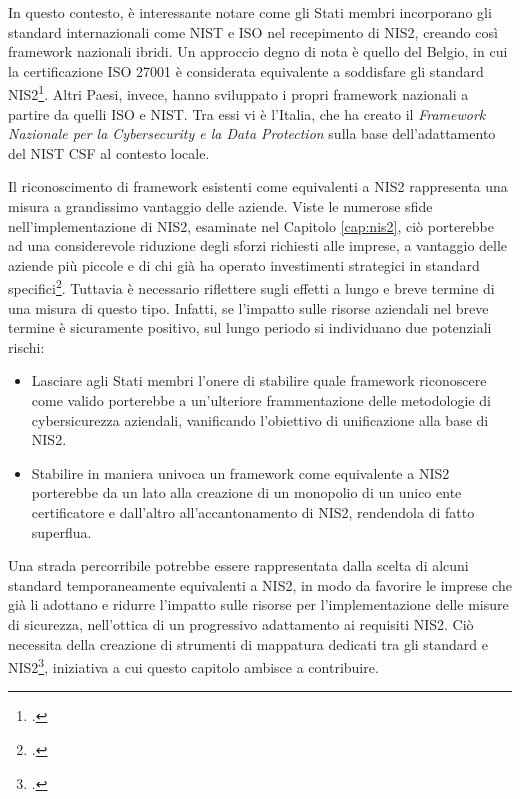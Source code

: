 In questo contesto, è interessante notare come gli Stati membri incorporano gli standard internazionali
come NIST e ISO nel recepimento di NIS2, creando così framework nazionali ibridi.
Un approccio degno di nota è quello del Belgio, in cui la certificazione ISO 27001 è considerata
equivalente a soddisfare gli standard NIS2\footcite[p. 4]{ecso-whitepaper-nis2}. Altri Paesi, invece,
hanno sviluppato i propri framework nazionali a partire da quelli ISO e NIST. Tra essi vi è l'Italia,
che ha creato il \textit{Framework Nazionale per la Cybersecurity e la Data Protection} sulla 
base dell'adattamento del NIST CSF al contesto locale.

Il riconoscimento di framework esistenti come equivalenti a NIS2 rappresenta una
misura a grandissimo vantaggio delle aziende. Viste le numerose sfide nell'implementazione
di NIS2, esaminate nel Capitolo \ref{cap:nis2}, ciò porterebbe ad una considerevole riduzione
degli sforzi richiesti alle imprese, a vantaggio delle aziende più piccole e di chi 
già ha operato investimenti strategici in standard specifici\footcite[p. 8]{ecso-whitepaper-nis2}. 
Tuttavia è necessario riflettere sugli effetti a lungo e breve termine di una misura
di questo tipo. Infatti, se l'impatto sulle risorse aziendali nel breve termine è sicuramente
positivo, sul lungo periodo si individuano due potenziali rischi:
\begin{itemize}
    \item Lasciare agli Stati membri l'onere di stabilire quale framework riconoscere come
    valido porterebbe a un'ulteriore frammentazione delle metodologie di cybersicurezza aziendali,
    vanificando l'obiettivo di unificazione alla base di NIS2.
    \item Stabilire in maniera univoca un framework come equivalente a NIS2 porterebbe da un lato
    alla creazione di un monopolio di un unico ente certificatore e dall'altro all'accantonamento
    di NIS2, rendendola di fatto superflua.
\end{itemize}
Una strada percorribile potrebbe essere rappresentata dalla scelta di alcuni standard temporaneamente
equivalenti a NIS2, in modo da favorire le imprese che già li adottano e ridurre l'impatto
sulle risorse per l'implementazione delle misure di sicurezza, nell'ottica di un progressivo
adattamento ai requisiti NIS2. Ciò necessita della creazione di strumenti di mappatura dedicati
tra gli standard e NIS2\footcite[pp. 7--9]{ecso-whitepaper-nis2}, iniziativa a cui questo capitolo
ambisce a contribuire.

